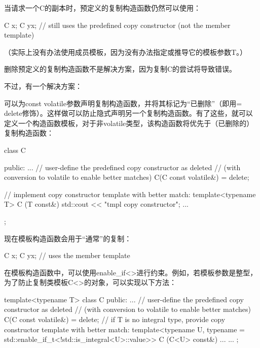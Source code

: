 当请求一个C的副本时，预定义的复制构造函数仍然可以使用：

\begin{cpp}
C x;
C y{x}; // still uses the predefined copy constructor (not the member template)
\end{cpp}

（实际上没有办法使用成员模板，因为没有办法指定或推导它的模板参数T。）

删除预定义的复制构造函数不是解决方案，因为复制C的尝试将导致错误。

不过，有一个解决方案：

可以为const volatile参数声明复制构造函数，并将其标记为“已删除”（即用= delete修饰）。这样做可以防止隐式声明另一个复制构造函数。有了这些，就可以定义一个构造函数模板，对于非volatile类型，该构造函数将优先于（已删除的）复制构造函数：

\begin{cpp}
class C {
public:
	...
	// user-define the predefined copy constructor as deleted
	// (with conversion to volatile to enable better matches)
	C(C const volatile&) = delete;
	
	// implement copy constructor template with better match:
	template<typename T>
	C (T const&) {
		std::cout << "tmpl copy constructor\n";
	}
...
};
\end{cpp}

现在模板构造函数会用于“通常”的复制：

\begin{cpp}
C x;
C y{x}; // uses the member template
\end{cpp}

在模板构造函数中，可以使用enable\_if<>进行约束。例如，若模板参数是整型，为了防止复制类模板C<>的对象，可以实现以下方法：

\begin{cpp}
template<typename T>
class C {
public:
	...
	// user-define the predefined copy constructor as deleted
	// (with conversion to volatile to enable better matches)
	C(C const volatile&) = delete;
	// if T is no integral type, provide copy constructor template with better match:
	template<typename U,
	typename = std::enable_if_t<!std::is_integral<U>::value>>
	C (C<U> const&) {
		...
	}
	...
};
\end{cpp}













